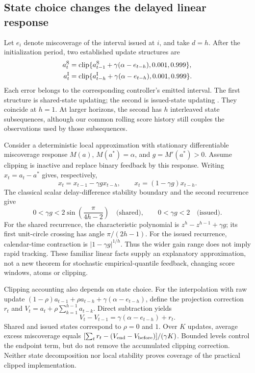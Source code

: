 \documentclass[preprint,11pt]{elsarticle}
\newcommand{\clip}{\operatorname{clip}}
\begin{document}
\subsection{State choice changes the delayed linear response}\label{sec:topology}
Let $e_i$ denote miscoverage of the interval issued at $i$, and take $d=h$.
After the initialization period, two established update structures are
\begin{align}
 a_t^{\rm S}&=\clip\{a_{t-1}^{\rm S}+\gamma(\alpha-e_{t-h}),0.001,0.999\},\label{eq:shared}\\
 a_t^{\rm I}&=\clip\{a_{t-h}^{\rm I}+\gamma(\alpha-e_{t-h}),0.001,0.999\}.\label{eq:issued}
\end{align}
Each error belongs to the corresponding controller's emitted interval. The first
structure is shared-state updating; the second is issued-state updating
\citep{wang2026acmcp,elhalabi2026delayed}. They coincide at $h=1$. At larger horizons,
the second has $h$ interleaved state subsequences, although our common rolling score
history still couples the observations used by those subsequences.

Consider a deterministic local approximation with stationary differentiable
miscoverage response $M(a)$, $M(a^*)=\alpha$, and $g=M'(a^*)>0$. Assume clipping
is inactive and replace binary feedback by this response. Writing $x_t=a_t-a^*$
gives, respectively,
\begin{equation}
 x_t=x_{t-1}-\gamma g x_{t-h},\qquad
 x_t=(1-\gamma g)x_{t-h}.
\end{equation}
The classical scalar delay-difference stability boundary \citep{deger2017stability}
and the second recurrence give
\begin{equation}\label{eq:stability}
 0<\gamma g<2\sin\!\left(\frac{\pi}{4h-2}\right)\quad\text{(shared)},
 \qquad 0<\gamma g<2\quad\text{(issued)}.
\end{equation}
For the shared recurrence, the characteristic polynomial is
$z^h-z^{h-1}+\gamma g$; its first unit-circle crossing has angle
$\pi/(2h-1)$. For the issued recurrence, calendar-time contraction is
$|1-\gamma g|^{1/h}$. Thus the wider gain range does not imply rapid tracking.
These familiar linear facts supply an explanatory approximation, not a new theorem
for stochastic empirical-quantile feedback, changing score windows, atoms or clipping.

Clipping accounting also depends on state choice. For the interpolation with raw update
$(1-\rho)a_{t-1}+\rho a_{t-h}+\gamma(\alpha-e_{t-h})$, define the projection correction
$r_t$ and $V_t=a_t+\rho\sum_{k=1}^{h-1}a_{t-k}$. Direct subtraction yields
\begin{equation}\label{eq:potential}
 V_t-V_{t-1}=\gamma(\alpha-e_{t-h})+r_t.
\end{equation}
Shared and issued states correspond to $\rho=0$ and $1$. Over $K$ updates,
average excess miscoverage equals
$[\sum_t r_t-(V_{\rm end}-V_{\rm before})]/(\gamma K)$.
Bounded levels control the endpoint term, but do not remove the accumulated clipping
correction. Neither state decomposition nor local stability proves coverage of the
practical clipped implementation.
\end{document}
